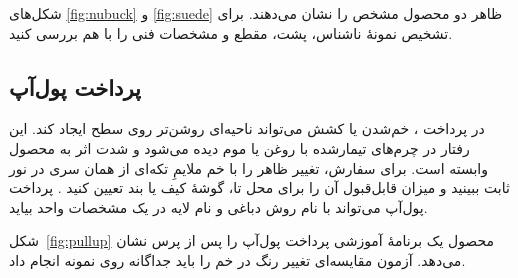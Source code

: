 شکل‌های \ref{fig:nubuck} و \ref{fig:suede} ظاهر دو محصول مشخص را نشان می‌دهند. برای تشخیص نمونۀ ناشناس، پشت، مقطع و مشخصات فنی را با هم بررسی کنید.

\subsection{پرداخت پول‌آپ}

در پرداخت ، خم‌شدن یا کشش می‌تواند ناحیه‌ای روشن‌تر روی سطح ایجاد کند. این رفتار در چرم‌های تیمارشده با روغن یا موم دیده می‌شود و شدت اثر به محصول وابسته است. برای سفارش، تغییر ظاهر را با خم ملایمِ تکه‌ای از همان سری در نور ثابت ببینید و میزان قابل‌قبول آن را برای محل تا، گوشۀ کیف یا بند تعیین کنید \cite{pullup}. پرداخت پول‌آپ می‌تواند با نام روش دباغی و نام لایه در یک مشخصات واحد بیاید.

شکل~\ref{fig:pullup} محصول یک برنامۀ آموزشی پرداخت پول‌آپ را پس از پرس نشان می‌دهد. آزمون مقایسه‌ای تغییر رنگ در خم را باید جداگانه روی نمونه انجام داد.

